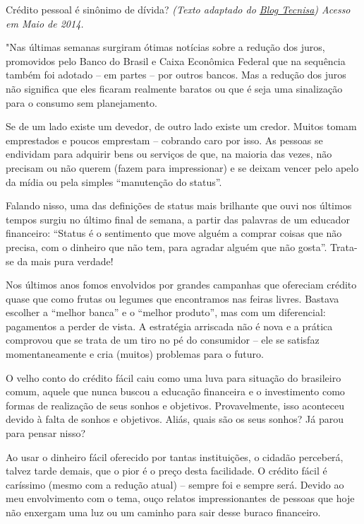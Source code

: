 \begin{task}{Crédito pessoal é sinônimo de dívida?}
\textit{(Texto adaptado do \href{http://www.blogtecnisa.com.br/mercado/credito-pessoal-e-sinonimo-de-divida/}{Blog Tecnisa}) Acesso em Maio de 2014.}

"Nas últimas semanas surgiram ótimas notícias sobre a redução dos juros, promovidos pelo Banco do Brasil e Caixa Econômica Federal que na sequência também foi adotado – em partes – por outros bancos. Mas a redução dos juros não significa que eles ficaram realmente baratos ou que é seja uma sinalização para o consumo sem planejamento.

Se de um lado existe um devedor, de outro lado existe um credor. Muitos tomam emprestados e poucos emprestam – cobrando caro por isso. As pessoas se endividam para adquirir bens ou serviços de que, na maioria das vezes, não precisam ou não querem (fazem para impressionar) e se deixam vencer pelo apelo da mídia ou pela simples “manutenção do status”.

Falando nisso, uma das definições de status mais brilhante que ouvi nos últimos tempos surgiu no último final de semana, a partir das palavras de um educador financeiro: “Status é o sentimento que move alguém a comprar coisas que não precisa, com o dinheiro que não tem, para agradar alguém que não gosta”. Trata-se da mais pura verdade!

Nos últimos anos fomos envolvidos por grandes campanhas que ofereciam crédito quase que como frutas ou legumes que encontramos nas feiras livres. Bastava escolher a “melhor banca” e o “melhor produto”, mas com um diferencial: pagamentos a perder de vista. A estratégia arriscada não é nova e a prática comprovou que se trata de um tiro no pé do consumidor – ele se satisfaz momentaneamente e cria (muitos) problemas para o futuro.

O velho conto do crédito fácil caiu como uma luva para situação do brasileiro comum, aquele que nunca buscou a educação financeira e o investimento como formas de realização de seus sonhos e objetivos. Provavelmente, isso aconteceu devido à falta de sonhos e objetivos. Aliás, quais são os seus sonhos? Já parou para pensar nisso?

Ao usar o dinheiro fácil oferecido por tantas instituições, o cidadão perceberá, talvez tarde demais, que o pior é o preço desta facilidade. O crédito fácil é caríssimo (mesmo com a redução atual) – sempre foi e sempre será. Devido ao meu envolvimento com o tema, ouço relatos impressionantes de pessoas que hoje não enxergam uma luz ou um caminho para sair desse buraco financeiro.


\end{task}
